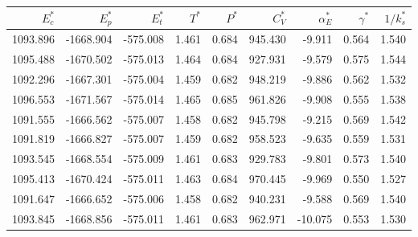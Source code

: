 \begin{tabular}{rrrrrrrrr}
\toprule
$E_c^*$ & $E_p^*$ & $E_t^*$ & $T^*$ & $P^*$ & $C_V^*$ & $\alpha_E^*$ & $\gamma^*$ & $1/k_s^*$ \\
\midrule
1093.896 & -1668.904 & -575.008 & 1.461 & 0.684 & 945.430 & -9.911 & 0.564 & 1.540 \\
1095.488 & -1670.502 & -575.013 & 1.464 & 0.684 & 927.931 & -9.579 & 0.575 & 1.544 \\
1092.296 & -1667.301 & -575.004 & 1.459 & 0.682 & 948.219 & -9.886 & 0.562 & 1.532 \\
1096.553 & -1671.567 & -575.014 & 1.465 & 0.685 & 961.826 & -9.908 & 0.555 & 1.538 \\
1091.555 & -1666.562 & -575.007 & 1.458 & 0.682 & 945.798 & -9.215 & 0.569 & 1.542 \\
1091.819 & -1666.827 & -575.007 & 1.459 & 0.682 & 958.523 & -9.635 & 0.559 & 1.531 \\
1093.545 & -1668.554 & -575.009 & 1.461 & 0.683 & 929.783 & -9.801 & 0.573 & 1.540 \\
1095.413 & -1670.424 & -575.011 & 1.463 & 0.684 & 970.445 & -9.969 & 0.550 & 1.527 \\
1091.647 & -1666.652 & -575.006 & 1.458 & 0.682 & 940.231 & -9.588 & 0.569 & 1.540 \\
1093.845 & -1668.856 & -575.011 & 1.461 & 0.683 & 962.971 & -10.075 & 0.553 & 1.530 \\
\bottomrule
\end{tabular}
